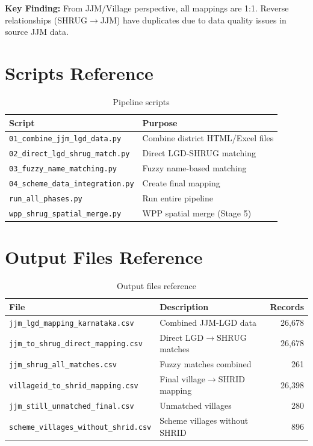 \documentclass[11pt,a4paper]{article}
\begin{document}
\textbf{Key Finding:} From JJM/Village perspective, all mappings are 1:1. Reverse relationships (SHRUG$\rightarrow$JJM) have duplicates due to data quality issues in source JJM data.

\section{Scripts Reference}

\begin{table}[h]
\centering
\small
\begin{tabular}{lp{7cm}}
\toprule
\textbf{Script} & \textbf{Purpose} \\
\midrule
\texttt{01\_combine\_jjm\_lgd\_data.py} & Combine district HTML/Excel files \\
\texttt{02\_direct\_lgd\_shrug\_match.py} & Direct LGD-SHRUG matching \\
\texttt{03\_fuzzy\_name\_matching.py} & Fuzzy name-based matching \\
\texttt{04\_scheme\_data\_integration.py} & Create final mapping \\
\texttt{run\_all\_phases.py} & Run entire pipeline \\
\texttt{wpp\_shrug\_spatial\_merge.py} & WPP spatial merge (Stage 5) \\
\bottomrule
\end{tabular}
\caption{Pipeline scripts}
\end{table}

\section{Output Files Reference}

\begin{table}[h]
\centering
\small
\begin{tabular}{lp{6cm}r}
\toprule
\textbf{File} & \textbf{Description} & \textbf{Records} \\
\midrule
\texttt{jjm\_lgd\_mapping\_karnataka.csv} & Combined JJM-LGD data & 26,678 \\
\texttt{jjm\_to\_shrug\_direct\_mapping.csv} & Direct LGD$\rightarrow$SHRUG matches & 26,678 \\
\texttt{jjm\_shrug\_all\_matches.csv} & Fuzzy matches combined & 261 \\
\texttt{villageid\_to\_shrid\_mapping.csv} & Final village$\rightarrow$SHRID mapping & 26,398 \\
\texttt{jjm\_still\_unmatched\_final.csv} & Unmatched villages & 280 \\
\texttt{scheme\_villages\_without\_shrid.csv} & Scheme villages without SHRID & 896 \\
\bottomrule
\end{tabular}
\caption{Output files reference}
\end{table}
\end{document}
